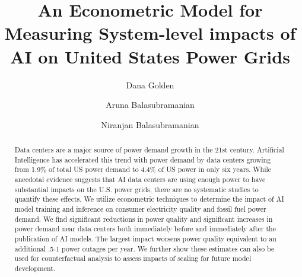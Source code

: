 \documentclass[sigconf,authordraft]{acmart}
\begin{document}
\title{An Econometric Model for Measuring System-level impacts of AI on United States Power Grids}

\author{Dana Golden}

\author{Aruna Balasubramanian}

\author{Niranjan Balasubramanian}



\renewcommand{\shortauthors}{Golden, Balasubramanian, Balasubramanian}

\begin{abstract}
Data centers are a major source of power demand growth in the 21st century. Artificial Intelligence has accelerated this trend with power demand by data centers growing from 1.9\% of total US power demand to 4.4\% of US power in only six years. While anecdotal evidence suggests that AI data centers are using enough power to have substantial impacts on the U.S. power grids, there are no systematic studies to quantify these effects. We utilize econometric techniques to determine the impact of AI model training and inference on consumer electricity quality and fossil fuel power demand. We find significant reductions in power quality and significant increases in power demand near data centers both immediately before and immediately after the publication of AI models. The largest impact worsens power quality equivalent to an additional .5-1 power outages per year. We further show these estimates can also be used for counterfactual analysis to assess impacts of scaling for future model development. 
\end{abstract}
\end{document}
